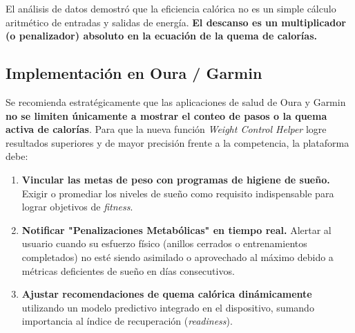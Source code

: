 \documentclass{article}
\begin{document}
El análisis de datos demostró que la eficiencia calórica no es un simple cálculo aritmético de entradas y salidas de energía. \textbf{El descanso es un multiplicador (o penalizador) absoluto en la ecuación de la quema de calorías.}

\subsection*{Implementación en Oura / Garmin}
Se recomienda estratégicamente que las aplicaciones de salud de Oura y Garmin \textbf{no se limiten únicamente a mostrar el conteo de pasos o la quema activa de calorías}. Para que la nueva función \textit{Weight Control Helper} logre resultados superiores y de mayor precisión frente a la competencia, la plataforma debe:
\begin{enumerate}
    \item \textbf{Vincular las metas de peso con programas de higiene de sueño.} Exigir o promediar los niveles de sueño como requisito indispensable para lograr objetivos de \textit{fitness}.
    \item \textbf{Notificar "Penalizaciones Metabólicas" en tiempo real.} Alertar al usuario cuando su esfuerzo físico (anillos cerrados o entrenamientos completados) no esté siendo asimilado o aprovechado al máximo debido a métricas deficientes de sueño en días consecutivos.
    \item \textbf{Ajustar recomendaciones de quema calórica dinámicamente} utilizando un modelo predictivo integrado en el dispositivo, sumando importancia al índice de recuperación (\textit{readiness}).
\end{enumerate}
\end{document}
